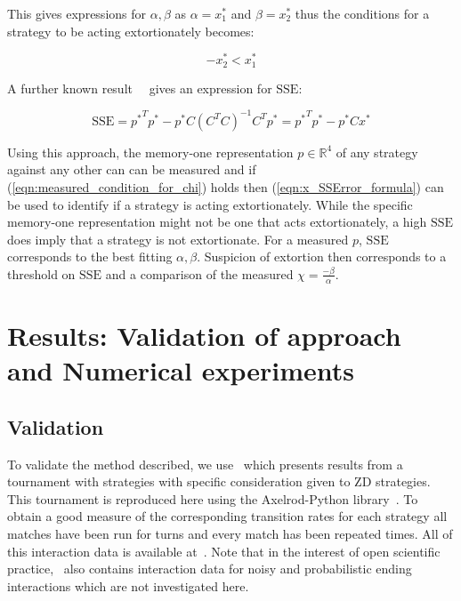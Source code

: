 \documentclass[a4paper]{article}
\newcommand{\SSe}{\text{SSE}}
\begin{document}
This gives expressions for \(\alpha, \beta\) as \(\alpha=x^*_1\) and
\(\beta=x^*_2\) thus the conditions for a strategy to be acting extortionately
becomes:

\begin{equation}
    -x^*_2 < x^*_1 \label{eqn:measured_condition_for_chi}
\end{equation}

A further known result~~\cite{kutner2004applied, rao1973linear,
wakefield2013bayesian} gives an expression for
\(\SSe\):

\begin{equation}\label{eqn:x_SSError_formula}
    \SSe = {p ^ *} ^ T p ^ * -
           p ^ * C \left(C ^ T C \right) ^ {-1} C ^ T p ^ *
         = {p ^ *} ^ T p ^ * - p ^ * C x ^ *
\end{equation}

Using this approach, the memory-one representation \(p\in\mathbb{R}^4\) of any
strategy against any other can can be measured and if
(\ref{eqn:measured_condition_for_chi}) holds then (\ref{eqn:x_SSError_formula})
can be used to identify if a strategy is acting extortionately. While the
specific memory-one representation might not be one that acts extortionately, a
high \(\SSe\) does imply that a strategy is not extortionate. For a measured
\(p\), \(\SSe\) corresponds to the best fitting \(\alpha, \beta\). Suspicion of
extortion then corresponds to a threshold on \(\SSe\) and a comparison of the
measured \(\chi=\frac{-\beta}{\alpha}\).

\section{Results: Validation of approach and Numerical experiments}\label{sec:numerical-experiments}

\subsection{Validation}

To validate the method described, we use~\cite{Stewart2012} which
presents results from a tournament with
strategies
with specific consideration given to ZD strategies. This
tournament is reproduced here using the Axelrod-Python
library~\cite{Knight2016}. To obtain a good measure of the corresponding
transition rates for each strategy all matches have been run for
turns and every match has been
repeated times. All of this
interaction data is available at~\cite{vincent_knight_2018_1297075}. Note that
in the interest of open scientific practice,~\cite{vincent_knight_2018_1297075}
also contains interaction data for noisy and probabilistic ending interactions
which are not investigated here.
\end{document}
